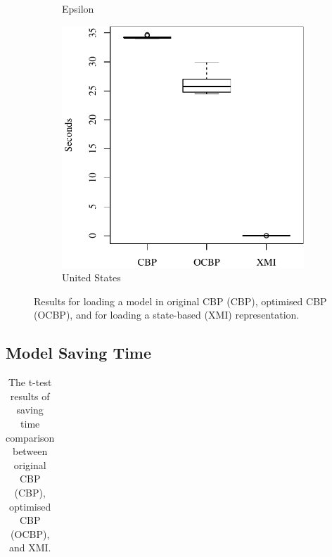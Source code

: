 \documentclass{llncs}
\begin{document}
{\begin{figure}[ht]
\begin{subfigure}{0.325\textwidth}
        \caption{Epsilon}
        \label{fig:load_time_epsilon}
    \end{subfigure}
    \hfill
    \begin{subfigure}{0.325\textwidth}
        \centering
        \includegraphics[width=\linewidth]{images/load_time_wikipedia}
        \caption{United States}
        \label{fig:load_time_wikipedia}
    \end{subfigure}
    \caption{Results for loading a model in original CBP (CBP), optimised CBP (OCBP), and for loading a state-based (XMI) representation.}
    \label{fig:loadtime}
\end{figure}

\subsection{Model Saving Time}
\label{subsec:saving_time_test}
 
 \vspace{-20pt}
  \begin{table}[ht]
     \small
     \centering
     \caption{The t-test results of saving time comparison between original CBP (CBP), optimised CBP (OCBP), and XMI.}
     \label{table:ttest_results_savetime}
     \begin{tabular}
         {|p{}|p{}|p{}|p{}|p{}|p{}|p{}|}
         \hline 
         

\end{tabular}
\end{table}}
\end{document}
